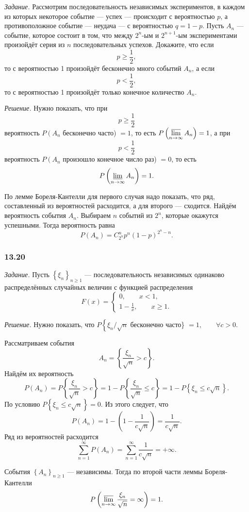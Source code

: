 \textit{Задание.}
Рассмотрим последовательность независимых экспериментов,
в каждом из которых некоторое событие --- успех --- происходит с вероятностью $p$, а противоположное событие --- неудача --- с вероятностью $q = 1 - p$.
Пусть $A_n$ --- событие, которое состоит в том, что между $2^n$-ым и $2^{n+1}$-ым экспериментами произойдёт серия из $n$ последовательных успехов.
Докажите, что если
$$p \geq \frac{1}{2},$$
то с вероятностью 1 произойдёт бесконечно много событий $A_n$, а если
$$p < \frac{1}{2},$$
то с вероятностью 1 произойдёт только конечное количество $A_n$.

\textit{Решение.} Нужно показать, что при
$$p \geq \frac{1}{2}$$
вероятность $P \left( A_n \right.$ бесконечно часто) $= 1$, то есть $P \left( \varlimsup \limits_{n \to \infty } A_n \right) = 1$, а при
$$p < \frac{1}{2}$$
вероятность $P \left( A_n \right.$ произошло конечное число раз) $= 0$, то есть
$$P \left( \varliminf \limits_{n \to \infty } A_n \right) = 1.$$

По лемме Бореля-Кантелли для первого случая надо показать, что ряд, составленный из вероятностей расходится, а для второго --- сходится.
Найдём вероятность события $A_n$.
Выбираем $n$ событий из $2^n$, которые окажутся успешными.
Тогда вероятность равна
$$P \left( A_n \right) =
C_{2^n}^n p^n \left( 1 - p \right)^{2^n-n}.$$

\subsubsection*{13.20}

\textit{Задание.} Пусть $ \left\{ \xi_n \right\}_{n \geq 1}$ --- последовательность независимых одинаково распределённых случайных величин с функцией распределения
$$F \left( x \right) =
\begin{cases}
0, \qquad x < 1, \\
1 - \frac{1}{x}, \qquad x \geq 1.
\end{cases}$$
 
\textit{Решение.} Нужно показать, что $P \left\{ \xi_n/ \sqrt{n} \right.$ бесконечно часто\} $= 1, \qquad \forall c > 0$.

Рассматриваем события
$$A_n =
\left\{ \frac{ \xi_n}{ \sqrt{n}} > c \right\}.$$
Найдём их вероятность
$$P \left( A_n \right) =
P \left\{ \frac{ \xi_n}{ \sqrt{n}} > c \right\} =
1 - P \left\{ \frac{ \xi_n}{ \sqrt{n}} \leq c \right\} =
1 - P \left\{ \xi_n \leq c \sqrt{n} \right\}.$$
По условию $P \left\{ \xi_n \leq c \sqrt{n} \right\} = 0$.
Из этого следует, что
$$P \left( A_n \right) =
1 - \left( 1 - \frac{1}{c \sqrt{n}} \right) =
\frac{1}{c \sqrt{n}}.$$
Ряд из вероятностей расходится
$$ \sum \limits_{n=1}^{ \infty }P \left( A_n \right) =
\sum \limits_{n=1}^{ \infty } \frac{1}{c \sqrt{n}} =
+ \infty.$$

События $ \left\{ A_n \right\}_{n \geq 1}$ --- независимы.
Тогда по второй части леммы Бореля-Кантелли
$$P \left( \varlimsup \limits_{n \to \infty } \frac{ \xi_n}{ \sqrt{n}} = \infty \right) =
1.$$
